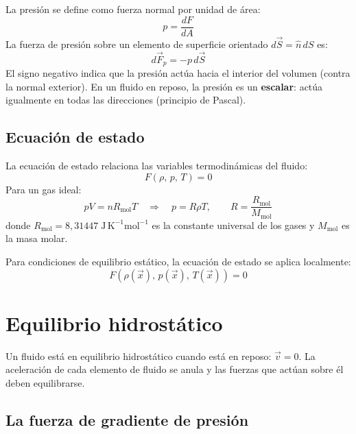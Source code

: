 La presión se define como fuerza normal por unidad de área:
\begin{equation}
    p = \frac{dF}{dA}
\end{equation}
La fuerza de presión sobre un elemento de superficie orientado $d\vec{S} = \hat{n}\,dS$ es:
\begin{equation}
    d\vec{F}_p = -p\,d\vec{S}
\end{equation}
El signo negativo indica que la presión actúa hacia el interior del volumen (contra la normal exterior). En un fluido en reposo, la presión es un \textbf{escalar}: actúa igualmente en todas las direcciones (principio de Pascal).

\subsection{Ecuación de estado}

La ecuación de estado relaciona las variables termodinámicas del fluido:
\begin{equation}
    F(\rho,\, p,\, T) = 0
\end{equation}
Para un gas ideal:
\begin{equation}
    pV = nR_{\text{mol}}T \quad \Longrightarrow \quad p = R\rho T, \qquad R = \frac{R_{\text{mol}}}{M_{\text{mol}}}
\end{equation}
donde $R_{\text{mol}} = 8{,}31447\;\text{J}\,\text{K}^{-1}\text{mol}^{-1}$ es la constante universal de los gases y $M_{\text{mol}}$ es la masa molar.

Para condiciones de equilibrio estático, la ecuación de estado se aplica localmente:
\begin{equation}
    F(\rho(\vec{x}),\, p(\vec{x}),\, T(\vec{x})) = 0
\end{equation}

\section{Equilibrio hidrostático}

Un fluido está en equilibrio hidrostático cuando está en reposo: $\vec{v} = 0$. La aceleración de cada elemento de fluido se anula y las fuerzas que actúan sobre él deben equilibrarse.

\subsection{La fuerza de gradiente de presión}

